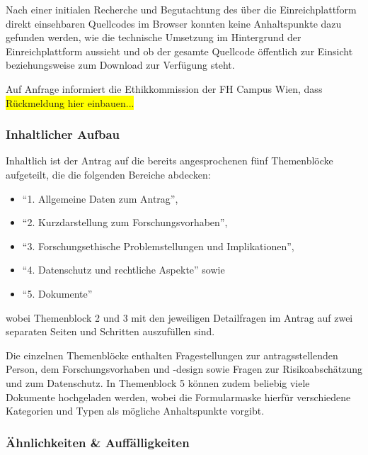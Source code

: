 \documentclass[a4paper,12pt,twoside]{scrreprt}
\begin{document}
\medskip

Nach einer initialen Recherche und Begutachtung des über die Einreichplattform direkt einsehbaren Quellcodes im Browser konnten keine Anhaltspunkte dazu gefunden werden, wie die technische Umsetzung im Hintergrund der Einreichplattform aussieht und ob der gesamte Quellcode öffentlich zur Einsicht beziehungsweise zum Download zur Verfügung steht.

Auf Anfrage informiert die Ethikkommission der FH Campus Wien, dass \colorbox{yellow}{Rückmeldung hier einbauen...}

\subsubsection*{Inhaltlicher Aufbau}
\label{sub-sub-sec:fhcw-inhaltlicher-aufbau}

Inhaltlich ist der Antrag auf die bereits angesprochenen fünf Themenblöcke aufgeteilt, die die folgenden Bereiche abdecken:
\begin{itemize}
    \item \enquote{1. Allgemeine Daten zum Antrag},
    \item \enquote{2. Kurzdarstellung zum Forschungsvorhaben},
    \item \enquote{3. Forschungsethische Problemstellungen und Implikationen},
    \item \enquote{4. Datenschutz und rechtliche Aspekte} sowie
    \item \enquote{5. Dokumente}
\end{itemize}

\noindent wobei Themenblock 2 und 3 mit den jeweiligen Detailfragen im Antrag auf zwei separaten Seiten und Schritten auszufüllen sind.

Die einzelnen Themenblöcke enthalten Fragestellungen zur antragsstellenden Person, dem Forschungsvorhaben und -design sowie Fragen zur Risikoabschätzung und zum Datenschutz. In Themenblock 5 können zudem beliebig viele Dokumente hochgeladen werden, wobei die Formularmaske hierfür verschiedene Kategorien und Typen als mögliche Anhaltspunkte vorgibt.

\subsubsection*{Ähnlichkeiten \& Auffälligkeiten}
\label{sub-sub-sec:ähnlichkeiten-auffälligkeiten-fhcw}
\end{document}
